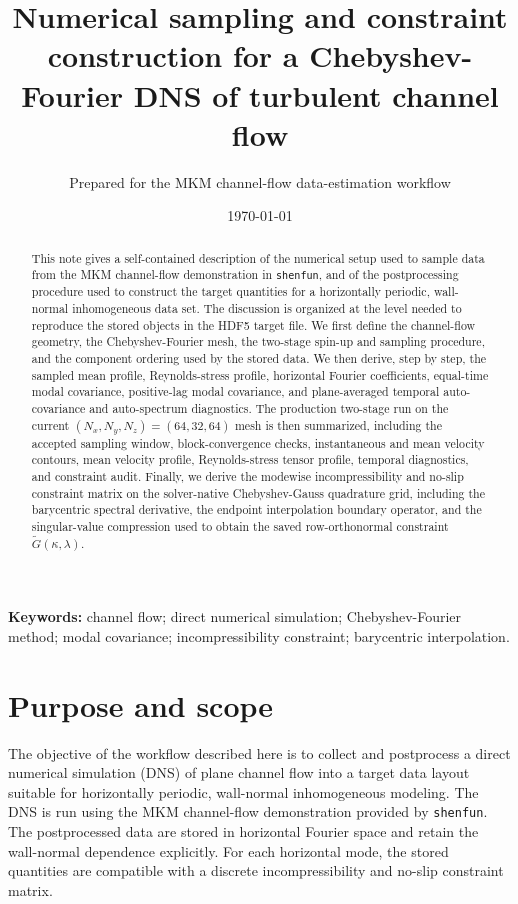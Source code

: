 \documentclass[11pt]{article}
\title{Numerical sampling and constraint construction for a Chebyshev-Fourier DNS of turbulent channel flow}
\author{Prepared for the MKM channel-flow data-estimation workflow}
\date{\today}
\newcommand{\Gtilde}{\widetilde{G}}
\begin{document}
\maketitle

\begin{abstract}
This note gives a self-contained description of the numerical setup used to
sample data from the MKM channel-flow demonstration in \texttt{shenfun}, and of
the postprocessing procedure used to construct the target quantities for a
horizontally periodic, wall-normal inhomogeneous data set. The discussion is
organized at the level needed to reproduce the stored objects in the HDF5
target file. We first define the channel-flow geometry, the Chebyshev-Fourier
mesh, the two-stage spin-up and sampling procedure, and the component ordering
used by the stored data. We then derive, step by step, the sampled mean
profile, Reynolds-stress profile, horizontal Fourier coefficients, equal-time
modal covariance, positive-lag modal covariance, and plane-averaged temporal
auto-covariance and auto-spectrum diagnostics. The production two-stage run on
the current \((N_x,N_y,N_z)=(64,32,64)\) mesh is then summarized, including
the accepted sampling window, block-convergence checks, instantaneous and mean
velocity contours, mean velocity profile, Reynolds-stress tensor profile,
temporal diagnostics, and constraint audit. Finally, we derive the modewise
incompressibility and no-slip
constraint matrix on the solver-native Chebyshev-Gauss quadrature grid,
including the barycentric spectral derivative, the endpoint interpolation
boundary operator, and the singular-value compression used to obtain the saved
row-orthonormal constraint \(\Gtilde(\kappa,\lambda)\).
\end{abstract}

\noindent\textbf{Keywords:}
channel flow; direct numerical simulation; Chebyshev-Fourier method; modal
covariance; incompressibility constraint; barycentric interpolation.

\section{Purpose and scope}

The objective of the workflow described here is to collect and postprocess a
direct numerical simulation (DNS) of plane channel flow into a target data
layout suitable for horizontally periodic, wall-normal inhomogeneous modeling.
The DNS is run using the MKM channel-flow demonstration provided by
\texttt{shenfun}. The postprocessed data are stored in horizontal Fourier space
and retain the wall-normal dependence explicitly. For each horizontal mode, the
stored quantities are compatible with a discrete incompressibility and no-slip
constraint matrix.
\end{document}
